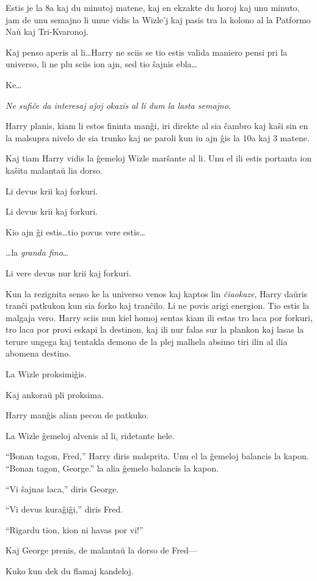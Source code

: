 Estis je la 8a kaj du minutoj matene, kaj en ekzakte du horoj kaj unu
minuto, jam de unu semajno li unue vidis la Wizle'j kaj pasis tra la
kolono al la Patformo Naŭ kaj Tri-Kvaronoj.

Kaj penso aperis al li\ldots Harry ne sciis se tio estis valida
maniero pensi pri la universo, li ne plu sciis ion ajn, sed tio ŝajnis
ebla\ldots

Ke\ldots

\emph{Ne sufiĉe da interesaj aĵoj okazis al li dum la lasta semajno.}

Harry planis, kiam li estos fininta manĝi, iri direkte al sia ĉambro
kaj kaŝi sin en la malsupra nivelo de sia trunko kaj ne paroli kun iu
ajn ĝis la 10a kaj 3 matene.

Kaj tiam Harry vidis la ĝemeloj Wizle marŝante al li. Unu el ili
estis portanta ion kaŝita malantaŭ lia dorso.

Li devus krii kaj forkuri.

Li devus krii kaj forkuri.

Kio ajn ĝi estis\ldots tio povus vere estis\ldots

\ldots la \emph{granda fino}\ldots

Li vere devus nur krii kaj forkuri.

Kun la rezignita senso ke la universo venos kaj kaptos lin
\emph{ĉiaokaze}, Harry daŭris tranĉi patkukon kun sia forko kaj
tranĉilo. Li ne povis arigi energion. Tio estis la malgaja vero. Harry
sciis nun kiel homoj sentas kiam ili estas tro laca por forkuri, tro
laca por provi eskapi la destinon, kaj ili nur falas sur la plankon
kaj lasas la terure ungega kaj tentakla demono de la plej malhela
absimo tiri ilin al ilia abomena destino.

La Wizle proksimiĝis.

Kaj ankoraŭ pli proksima.

Harry manĝis alian pecon de patkuko.

La Wizle ĝemeloj alvenis al li, ridetante hele.

``Bonan tagon, Fred,'' Harry diris malsprita. Unu el la ĝemeloj
balancis la kapon. ``Bonan tagon, George.'' la alia ĝemelo balancis la
kapon.

``Vi ŝajnas laca,'' diris George.

``Vi devus kuraĝiĝi,'' diris Fred.

``Rigardu tion, kion ni havas por vi!''

Kaj George prenis, de malantaŭ la dorso de Fred—


Kuko kun dek du flamaj kandeloj.

